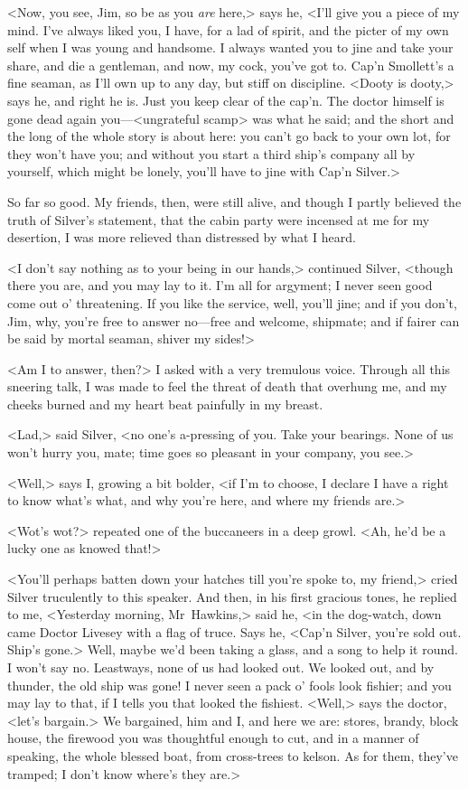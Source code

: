 <Now, you see, Jim, so be as you \textit{are} here,> says he, <I'll give you a piece of my mind. I've always liked you, I have, for a lad of spirit, and the picter of my own self when I was young and handsome. I always wanted you to jine and take your share, and die a gentleman, and now, my cock, you've got to. Cap'n Smollett's a fine seaman, as I'll own up to any day, but stiff on discipline. <Dooty is dooty,> says he, and right he is. Just you keep clear of the cap'n. The doctor himself is gone dead again you—<ungrateful scamp> was what he said; and the short and the long of the whole story is about here: you can't go back to your own lot, for they won't have you; and without you start a third ship's company all by yourself, which might be lonely, you'll have to jine with Cap'n Silver.>

So far so good. My friends, then, were still alive, and though I partly believed the truth of Silver's statement, that the cabin party were incensed at me for my desertion, I was more relieved than distressed by what I heard.

<I don't say nothing as to your being in our hands,> continued Silver, <though there you are, and you may lay to it. I'm all for argyment; I never seen good come out o' threatening. If you like the service, well, you'll jine; and if you don't, Jim, why, you're free to answer no—free and welcome, shipmate; and if fairer can be said by mortal seaman, shiver my sides!>

<Am I to answer, then?> I asked with a very tremulous voice. Through all this sneering talk, I was made to feel the threat of death that overhung me, and my cheeks burned and my heart beat painfully in my breast.

<Lad,> said Silver, <no one's a-pressing of you. Take your bearings. None of us won't hurry you, mate; time goes so pleasant in your company, you see.>

<Well,> says I, growing a bit bolder, <if I'm to choose, I declare I have a right to know what's what, and why you're here, and where my friends are.>

<Wot's wot?> repeated one of the buccaneers in a deep growl. <Ah, he'd be a lucky one as knowed that!>

<You'll perhaps batten down your hatches till you're spoke to, my friend,> cried Silver truculently to this speaker. And then, in his first gracious tones, he replied to me, <Yesterday morning, Mr~Hawkins,> said he, <in the dog-watch, down came Doctor Livesey with a flag of truce. Says he, <Cap'n Silver, you're sold out. Ship's gone.> Well, maybe we'd been taking a glass, and a song to help it round. I won't say no. Leastways, none of us had looked out. We looked out, and by thunder, the old ship was gone! I never seen a pack o' fools look fishier; and you may lay to that, if I tells you that looked the fishiest. <Well,> says the doctor, <let's bargain.> We bargained, him and I, and here we are: stores, brandy, block house, the firewood you was thoughtful enough to cut, and in a manner of speaking, the whole blessed boat, from cross-trees to kelson. As for them, they've tramped; I don't know where's they are.>

